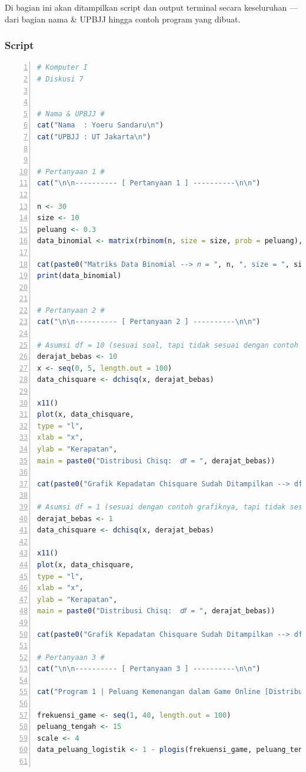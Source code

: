 Di bagian ini akan ditampilkan script dan output terminal secara keseluruhan --- dari bagian nama \& UPBJJ hingga contoh program yang dibuat. 

\subsubsection{Script}

\begin{lstlisting}[language=R, numbers=left, basicstyle=\small\ttfamily]
# Komputer I
# Diskusi 7


# Nama & UPBJJ #
cat("Nama  : Yoeru Sandaru\n")
cat("UPBJJ : UT Jakarta\n")


# Pertanyaan 1 #
cat("\n\n---------- [ Pertanyaan 1 ] ----------\n\n")

n <- 30
size <- 10
peluang <- 0.3
data_binomial <- matrix(rbinom(n, size = size, prob = peluang), ncol = 5)

cat(paste0("Matriks Data Binomial --> 𝑛 = ", n, ", size = ", size, ", 𝑝 = ", peluang, "\n"))
print(data_binomial)


# Pertanyaan 2 #
cat("\n\n---------- [ Pertanyaan 2 ] ----------\n\n")

# Asumsi df = 10 (sesuai soal, tapi tidak sesuai dengan contoh grafiknya)
derajat_bebas <- 10
x <- seq(0, 5, length.out = 100)
data_chisquare <- dchisq(x, derajat_bebas)

x11()
plot(x, data_chisquare,
type = "l",
xlab = "x",
ylab = "Kerapatan",
main = paste0("Distribusi Chisq:  𝑑𝑓 = ", derajat_bebas))

cat(paste0("Grafik Kepadatan Chisquare Sudah Ditampilkan --> df = ", derajat_bebas, "\n"))

# Asumsi df = 1 (sesuai dengan contoh grafiknya, tapi tidak sesuai soal)
derajat_bebas <- 1
data_chisquare <- dchisq(x, derajat_bebas)

x11()
plot(x, data_chisquare,
type = "l",
xlab = "x",
ylab = "Kerapatan",
main = paste0("Distribusi Chisq:  𝑑𝑓 = ", derajat_bebas))

cat(paste0("Grafik Kepadatan Chisquare Sudah Ditampilkan --> df = ", derajat_bebas, "\n"))

# Pertanyaan 3 #
cat("\n\n---------- [ Pertanyaan 3 ] ----------\n\n")

cat("Program 1 | Peluang Kemenangan dalam Game Online [Distribusi Logistik]\n\n")

frekuensi_game <- seq(1, 40, length.out = 100)
peluang_tengah <- 15
scale <- 4
data_peluang_logistik <- 1 - plogis(frekuensi_game, peluang_tengah, scale)


\end{lstlisting}
